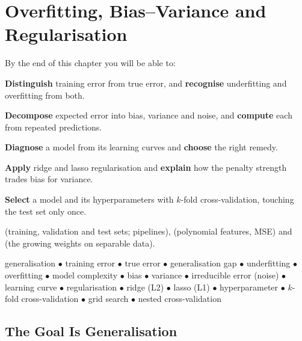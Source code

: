 \chapter{Overfitting, Bias--Variance and Regularisation}\label{ch:generalization}

\begin{outcomes}
By the end of this chapter you will be able to:
\begin{tight}
  \item \textbf{Distinguish} training error from true error, and
        \textbf{recognise} underfitting and overfitting from both.
  \item \textbf{Decompose} expected error into bias, variance and noise, and
        \textbf{compute} each from repeated predictions.
  \item \textbf{Diagnose} a model from its learning curves and \textbf{choose} the
        right remedy.
  \item \textbf{Apply} ridge and lasso regularisation and \textbf{explain} how the
        penalty strength trades bias for variance.
  \item \textbf{Select} a model and its hyperparameters with $k$-fold
        cross-validation, touching the test set only once.
\end{tight}
\end{outcomes}

\begin{prereq}
 (training, validation and test sets; pipelines),
 (polynomial features, MSE) and  (the growing weights
on separable data).
\end{prereq}

\begin{keyterms}
generalisation $\bullet$ training error $\bullet$ true error $\bullet$
generalisation gap $\bullet$ underfitting $\bullet$ overfitting $\bullet$ model
complexity $\bullet$ bias $\bullet$ variance $\bullet$ irreducible error (noise)
$\bullet$ learning curve $\bullet$ regularisation $\bullet$ ridge (L2) $\bullet$
lasso (L1) $\bullet$ hyperparameter $\bullet$ $k$-fold cross-validation $\bullet$
grid search $\bullet$ nested cross-validation
\end{keyterms}

\section{The Goal Is Generalisation}

